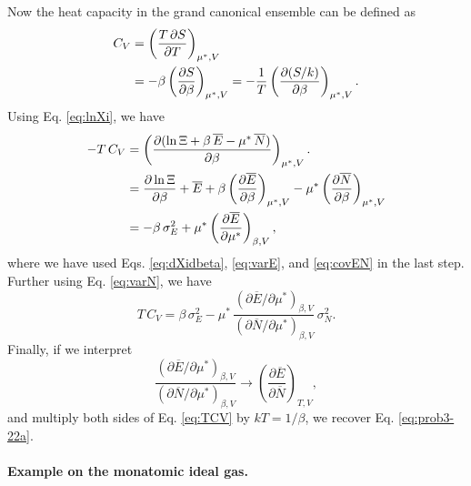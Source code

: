 \documentclass[twocolumn, 10pt]{article}
\numberwithin{equation}{section}
\newenvironment{solution}[1][\empty]
{\par\medskip\sffamily
  \textbf{\ifx\empty#1{Solution.}\relax\else{#1}\fi} \ignorespaces}
{\medskip}
\begin{document}
\begin{solution}
Now the heat capacity in the grand canonical ensemble can be defined as
%
\begin{align}
C_V
&= \left( \frac{ T \, \partial S } { \partial T } \right)_{\mu^*, V}
\notag \\
&= -\beta \left( \frac{ \partial S } { \partial \beta } \right)_{\mu^*, V}
= -\frac{1}{T} \left( \frac{ \partial (S/k) } { \partial \beta } \right)_{\mu^*, V}.
\label{eq:CV_def}
\end{align}
%
Using Eq. \eqref{eq:lnXi}, we have
\begin{align}
-T \, C_V
  &= \left( \frac{ \partial (\ln \Xi + \beta \, \overline E - \mu^* \, \overline N) }
  { \partial \beta } \right)_{\mu^*, V}.
  \notag
  \\
  &= \frac{ \partial \ln \Xi } { \partial \beta }
  + \overline E
  + \beta \left( \frac{ \partial \overline E } { \partial \beta } \right)_{\mu^*, V}
  - \mu^* \left( \frac{ \partial \overline N } { \partial \beta } \right)_{\mu^*, V}
  \notag
  \\
  &=
  - \beta \, \sigma_E^2
  + \mu^* \left( \frac{ \partial \overline E } { \partial \mu^* } \right)_{\beta, V}
  ,
  \notag
\end{align}
%
where we have used Eqs. \eqref{eq:dXidbeta}, \eqref{eq:varE}, and \eqref{eq:covEN}
in the last step.
%
Further using Eq. \eqref{eq:varN}, we have
\begin{equation}
T \, C_V
=
\beta \, \sigma_E^2
-
\mu^* \,
\frac{ \left( \partial \overline E / \partial \mu^* \right)_{\beta, V} }
     { \left( \partial \overline N / \partial \mu^* \right)_{\beta, V} }
\, \sigma_N^2
.
\label{eq:TCV}
\end{equation}
%
Finally, if we interpret
$$
\frac{ \left( \partial \overline E / \partial \mu^* \right)_{\beta, V} }
     { \left( \partial \overline N / \partial \mu^* \right)_{\beta, V} }
\to
\left(
  \frac{ \partial \overline E }
       { \partial \overline N }
\right)_{T, V}
,
$$
and multiply both sides of Eq. \eqref{eq:TCV} by $k T = 1/\beta$,
we recover Eq. \eqref{eq:prob3-22a}.

\paragraph*{Example on the monatomic ideal gas.}


\end{solution}
\end{document}
